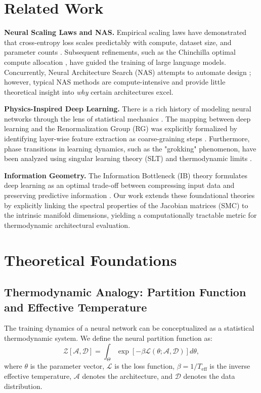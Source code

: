 \documentclass[11pt, a4paper]{article}
\theoremstyle{definition}
\begin{document}
\section{Related Work}
\label{sec:related-work}

\textbf{Neural Scaling Laws and NAS.} Empirical scaling laws have demonstrated that cross-entropy loss scales predictably with compute, dataset size, and parameter counts \cite{kaplan2020scaling}. Subsequent refinements, such as the Chinchilla optimal compute allocation \cite{hoffmann2022training}, have guided the training of large language models. Concurrently, Neural Architecture Search (NAS) attempts to automate design \cite{zoph2016neural, elsken2019neural}; however, typical NAS methods are compute-intensive and provide little theoretical insight into \textit{why} certain architectures excel.

\textbf{Physics-Inspired Deep Learning.} There is a rich history of modeling neural networks through the lens of statistical mechanics \cite{bahri2020statistical, roberts2022principles}. The mapping between deep learning and the Renormalization Group (RG) was explicitly formalized by identifying layer-wise feature extraction as coarse-graining steps \cite{mehta2014exact}. Furthermore, phase transitions in learning dynamics, such as the "grokking" phenomenon, have been analyzed using singular learning theory (SLT) and thermodynamic limits \cite{watanabe2009algebraic}.

\textbf{Information Geometry.} The Information Bottleneck (IB) theory formulates deep learning as an optimal trade-off between compressing input data and preserving predictive information \cite{tishby2015deep}. Our work extends these foundational theories by explicitly linking the spectral properties of the Jacobian matrices (SMC) to the intrinsic manifold dimensions, yielding a computationally tractable metric for thermodynamic architectural evaluation.

\section{Theoretical Foundations}
\label{sec:foundations}

\subsection{Thermodynamic Analogy: Partition Function and Effective Temperature}
\label{subsec:thermo}

The training dynamics of a neural network can be conceptualized as a statistical thermodynamic system. We define the neural partition function as:
\begin{equation}
    \mathcal{Z}[\mathcal{A}, \mathcal{D}] = \int_{\Theta} \exp\left[-\beta \mathcal{L}(\theta; \mathcal{A}, \mathcal{D})\right] d\theta,
\end{equation}
where $\theta$ is the parameter vector, $\mathcal{L}$ is the loss function, $\beta = 1/T_{\text{eff}}$ is the inverse effective temperature, $\mathcal{A}$ denotes the architecture, and $\mathcal{D}$ denotes the data distribution.
\end{document}
